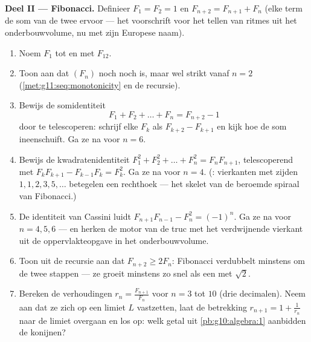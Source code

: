 \begin{problem}
\medskip
\noindent\textbf{Deel II --- Fibonacci.}
Definieer $F_1 = F_2 = 1$ en $F_{n+2} = F_{n+1} + F_n$ (elke term de som van
de twee ervoor --- het voorschrift voor het tellen van ritmes uit het
onderbouwvolume, nu met zijn Europese naam).
\begin{enumerate}[resume]
  \item Noem $F_1$ tot en met $F_{12}$.
  \item Toon aan dat $(F_n)$ noch  noch  is, maar wel
        strikt  vanaf $n = 2$ (\cref{met:g11:seq:monotonicity} en de
        recursie).
  \item Bewijs de somidentiteit
        \[
        F_1 + F_2 + \dots + F_n = F_{n+2} - 1
        \]
        door te telescoperen: schrijf elke $F_k$ als $F_{k+2} - F_{k+1}$ en
        kijk hoe de som ineenschuift. Ga ze na voor $n = 6$.
  \item Bewijs de kwadratenidentiteit
        $F_1^2 + F_2^2 + \dots + F_n^2 = F_n F_{n+1}$, telescoperend met
        $F_k F_{k+1} - F_{k-1} F_k = F_k^2$. Ga ze na voor $n = 4$.
        (: vierkanten met zijden $1, 1, 2, 3, 5, \dots$ betegelen een
        rechthoek --- het skelet van de beroemde spiraal van Fibonacci.)
  \item De identiteit van Cassini luidt
        $F_{n+1} F_{n-1} - F_n^2 = (-1)^n$. Ga ze na voor $n = 4, 5, 6$ ---
        en herken de motor van de truc met het verdwijnende vierkant uit de
        oppervlakteopgave in het onderbouwvolume.
  \item Toon uit de recursie aan dat $F_{n+2} \geq 2 F_n$: Fibonacci
        verdubbelt minstens om de twee stappen --- ze groeit minstens zo snel
        als een  met  $\sqrt2$.
  \item Bereken de verhoudingen $r_n = \frac{F_{n+1}}{F_n}$ voor $n = 3$ tot
        $10$ (drie decimalen). Neem aan dat ze zich op een limiet $L$
        vastzetten, laat de betrekking $r_{n+1} = 1 + \frac{1}{r_n}$ naar de
        limiet overgaan en los op: welk getal uit \cref{pb:g10:algebra:1}
        aanbidden de konijnen?
\end{enumerate}


\end{problem}
